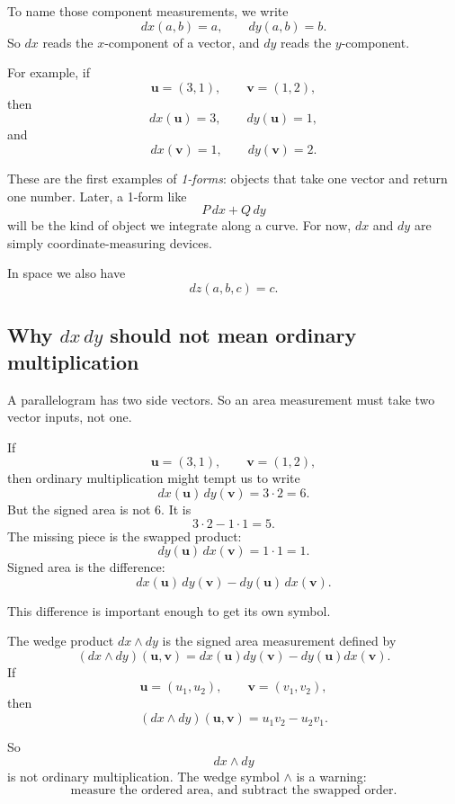 To name those component measurements, we write
\[
    dx(a,b)=a,
    \qquad
    dy(a,b)=b.
\]
So \(dx\) reads the \(x\)-component of a vector, and \(dy\) reads the \(y\)-component.

For example, if
\[
    \mathbf u=(3,1),
    \qquad
    \mathbf v=(1,2),
\]
then
\[
    dx(\mathbf u)=3,
    \qquad
    dy(\mathbf u)=1,
\]
and
\[
    dx(\mathbf v)=1,
    \qquad
    dy(\mathbf v)=2.
\]

These are the first examples of \emph{1-forms}: objects that take one vector and return
one number.  Later, a 1-form like
\[
    P\,dx+Q\,dy
\]
will be the kind of object we integrate along a curve.  For now, \(dx\) and \(dy\)
are simply coordinate-measuring devices.

In space we also have
\[
    dz(a,b,c)=c.
\]

\subsection{Why \(dx\,dy\) should not mean ordinary multiplication}

A parallelogram has two side vectors.  So an area measurement must take two vector
inputs, not one.

If
\[
    \mathbf u=(3,1),
    \qquad
    \mathbf v=(1,2),
\]
then ordinary multiplication might tempt us to write
\[
    dx(\mathbf u)\,dy(\mathbf v)=3\cdot2=6.
\]
But the signed area is not \(6\).  It is
\[
    3\cdot2-1\cdot1=5.
\]
The missing piece is the swapped product:
\[
    dy(\mathbf u)\,dx(\mathbf v)=1\cdot1=1.
\]
Signed area is the difference:
\[
    dx(\mathbf u)\,dy(\mathbf v)-dy(\mathbf u)\,dx(\mathbf v).
\]

This difference is important enough to get its own symbol.

\begin{definition}
The wedge product \(dx\wedge dy\) is the signed area measurement defined by
\[
\boxed{
    (dx\wedge dy)(\mathbf u,\mathbf v)
    =
    dx(\mathbf u)dy(\mathbf v)
    -
    dy(\mathbf u)dx(\mathbf v).
}
\]
If
\[
    \mathbf u=(u_1,u_2),
    \qquad
    \mathbf v=(v_1,v_2),
\]
then
\[
\boxed{
    (dx\wedge dy)(\mathbf u,\mathbf v)
    =
    u_1v_2-u_2v_1.
}
\]
\end{definition}

So
\[
    dx\wedge dy
\]
is not ordinary multiplication.  The wedge symbol \(\wedge\) is a warning:
\[
    \text{measure the ordered area, and subtract the swapped order.}
\]

